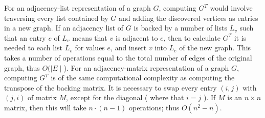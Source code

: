 For an adjacency-list representation of a graph $ G $, computing $ G^T $ would involve traversing every list contained by $ G $ and adding the discovered vertices as entries in a new graph. If an adjacency list of $ G $ is backed by a number of lists $ L_v $ such that an entry $ e $ of $ L_v $ means that $ v $ is adjacent to $ e $, then to calculate $ G^T $ it is needed to each list $ L_v $ for values $ e $, and insert $ v $ into $ L_e $ of the new graph. This takes a number of operations equal to the total number of edges of the original graph, thus $ O ( \mid E \mid $).
For an adjacency-matrix representation of a graph $ G $, computing $ G^T $ is of the same computational complexity as computing the transpose of the backing matrix. It is necessary to swap every entry $ (i,j) $ with $ (j, i) $ of matrix $ M $, except for the diagonal ( where that $ i = j $ ). If $ M $ is an $ n \times n $ matrix, then this will take $ n \cdot (n - 1) $ operations; thus $ O (n^2 - n) $.